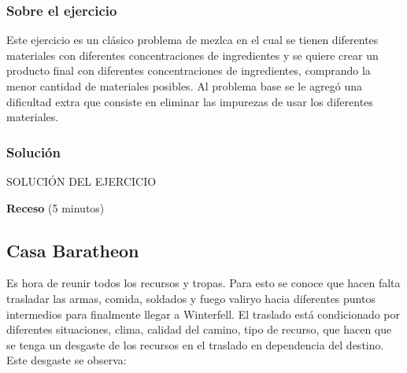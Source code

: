 \documentclass[a4paper,10pt,twocolumn]{article}
\theoremstyle{theorem}
\theoremstyle{definition}
\theoremstyle{remark}
\begin{document}
		\subsubsection{Sobre el ejercicio}\label{subsubsec:sobre_ejer_3}

Este ejercicio es un clásico problema de mezlca en el cual se tienen diferentes materiales con diferentes concentraciones de ingredientes y se quiere crear un producto final con diferentes concentraciones de ingredientes, comprando la menor cantidad de materiales posibles. Al problema base se le agregó una dificultad extra que consiste en eliminar las impurezas de usar los diferentes materiales.

		\subsubsection{Solución}\label{subsubsec:sol_ejer_3}

SOLUCIÓN DEL EJERCICIO


\textbf{Receso} (5 minutos)

	\subsection{Casa Baratheon}\label{subsec:ejer_4}

Es hora de reunir todos los recursos y tropas. Para esto se conoce que hacen falta trasladar las armas, comida, soldados y fuego valiryo hacia diferentes puntos intermedios para finalmente llegar a Winterfell. El traslado está condicionado por diferentes situaciones, clima, calidad del camino, tipo de recurso, que hacen que se tenga un desgaste de los recursos en el traslado en dependencia del destino. Este desgaste se observa:
\end{document}
